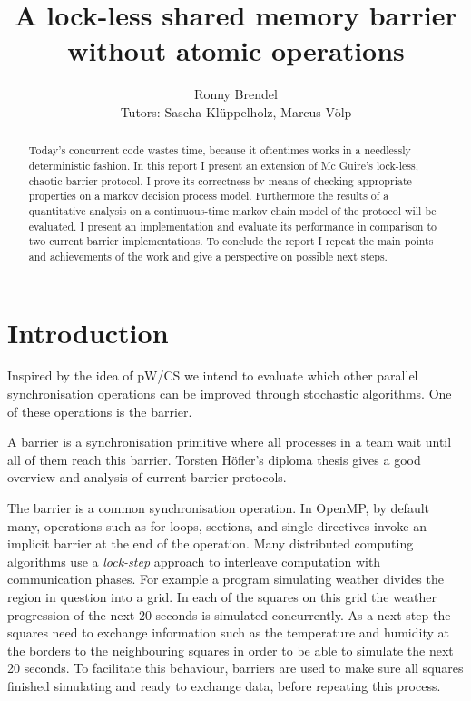 \documentclass[a4paper, 10pt]{article}
\title{A lock-less shared memory barrier without atomic operations}
\author{Ronny Brendel\\Tutors: Sascha Kl\"uppelholz, Marcus V\"olp}
\begin{document}
\maketitle

\begin{abstract}
Today's concurrent code wastes time, because it oftentimes works in a needlessly deterministic fashion. In this report I present an extension of Mc Guire's lock-less, chaotic barrier protocol. I prove its correctness by means of checking appropriate properties on a markov decision process model. Furthermore the results of a quantitative analysis on a continuous-time markov chain model of the protocol will be evaluated. I present an implementation and evaluate its performance in comparison to two current barrier implementations. To conclude the report I repeat the main points and achievements of the work and give a perspective on possible next steps.
\end{abstract}

\section{Introduction}
Inspired by the idea of pW/CS\cite{pwcs} we intend to evaluate which other parallel synchronisation operations can be improved through stochastic algorithms. One of these operations is the barrier.

A barrier is a synchronisation primitive where all processes in a team wait until all of them reach this barrier. Torsten H\"ofler's diploma thesis\cite{hoefler2005} gives a good overview and analysis of current barrier protocols.

The barrier is a common synchronisation operation. In OpenMP\cite{omp}, by default many, operations such as for-loops, sections, and single directives invoke an implicit barrier at the end of the operation. Many distributed computing algorithms use a \emph{lock-step} approach to interleave computation with communication phases. For example a program simulating weather divides the region in question into a grid. In each of the squares on this grid the weather progression of the next 20 seconds is simulated concurrently. As a next step the squares need to exchange information such as the temperature and humidity at the borders to the neighbouring squares in order to be able to simulate the next 20 seconds. To facilitate this behaviour, barriers are used to make sure all squares finished simulating and ready to exchange data, before repeating this process.
\end{document}
